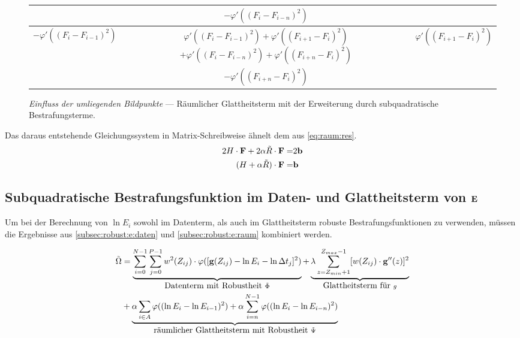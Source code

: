 \begin{figure}[H]
  \begin{center}
    \begin{tabular}{c|c|c}
        \cline{2-2}
        & $-\varphi'((F_i - F_{i-n})^2)$ & \\
        \hline
            \multicolumn{1}{|c|}{$-\varphi'((F_i - F_{i-1})^2)$}
            & \shortstack{$\varphi'((F_i - F_{i-1})^2) + \varphi'((F_{i+1} - F_{i})^2) $ \\
              $ +\varphi'((F_i - F_{i-n})^2) + \varphi'((F_{i+n} - F_{i})^2)$} & 
            \multicolumn{1}{c|}{$\varphi'((F_{i+1} - F_{i})^2)$}\\
        \hline
        & $-\varphi'((F_{i+n} - F_{i})^2)$ & \\
        \cline{2-2} 
    \end{tabular}
  \end{center}
\caption{\textit{Einfluss der umliegenden Bildpunkte} --- Räumlicher Glattheitsterm mit der Erweiterung durch subquadratische Bestrafungsterme.}
\label{fig:robust:raum:stencil}
\end{figure}

Das daraus entstehende Gleichungssystem in Matrix-Schreibweise ähnelt dem aus \autoref{eq:raum:res}. 
\begin{align}
\label{eq:robust:raum:lgs}
2 H \cdot \mathbf F + 2 \alpha \tilde R\cdot \mathbf F =& 2 \mathbf b \\
(H+\alpha \tilde R)\cdot \mathbf F =& \mathbf b
\end{align}






\subsection{Subquadratische Bestrafungsfunktion im Daten- und Glattheitsterm von $\mathbf E$ }
Um bei der Berechnung von $\ln E_i$ sowohl im Datenterm, als auch im Glattheitsterm robuste Bestrafungsfunktionen zu verwenden, müssen die Ergebnisse aus \autoref{subsec:robust:e:daten} und \autoref{subsec:robust:e:raum} kombiniert werden.


\begin{align}
\tilde{\Omega} &= 
    \underbrace{\sum_{i=0}^{N-1} \sum_{j=0}^{P-1} w^2(Z_{ij})
    \cdot \varphi([\mathbf g(Z_{ij}) - \ln E_i - \ln \Delta t_j]^2)}_{\mbox{Datenterm mit Robustheit }\tilde{\Phi}}
    + \underbrace{\lambda  \sum_{z=Z_{min}+1}^{Z_{max}-1} [w(Z_{ij}) \cdot \mathbf g''(z)]^2}_{\mbox{Glattheitsterm für }g} \nonumber\\
    & + \underbrace{
        \alpha \sum_{i\in A}
            \varphi((\ln E_i - \ln E_{i-1})^2)
        +\alpha \sum_{i=n}^{N-1}\varphi((\ln E_i - \ln E_{i-n})^2)
    }_{\mbox{räumlicher Glattheitsterm mit Robustheit }\Tilde \Psi}
\end{align}

